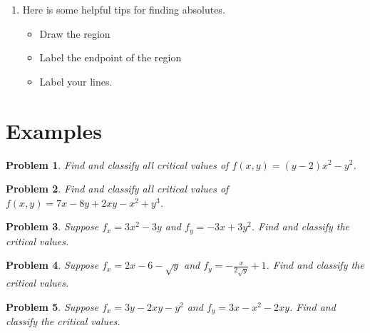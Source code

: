 \documentclass[11pt]{article}
\newtheorem{problem}{Problem}
\begin{document}
\begin{enumerate}
\item Here is some helpful tips for finding absolutes.

\begin{itemize}
    \item Draw the region
    \item Label the endpoint of the region
    \item Label your lines.
\end{itemize}



\end{enumerate}





\newpage

\section{Examples}


\begin{problem}
    Find and classify all critical values of $f(x,y) = (y-2)x^2-y^2$.
\end{problem}




\vspace{8cm}

\begin{problem}
    Find and classify all critical values of $f(x,y) = 7x-8y+2xy-x^2+y^3$.
\end{problem}

\newpage


\begin{problem}
    Suppose $f_x = 3x^2-3y$ and $f_y = -3x+3y^2$. Find and classify the critical values.
\end{problem}

\vspace{8cm}


\begin{problem}
        Suppose $f_x = 2x-6-\sqrt{y}$ and $f_y = -\frac{x}{2\sqrt{y}}+1$. Find and classify the critical values.
\end{problem}



\newpage

\begin{problem}
        Suppose $f_x = 3y-2xy-y^2$ and $f_y = 3x-x^2-2xy$. Find and classify the critical values.
\end{problem}

\vspace{6cm}
\end{document}
